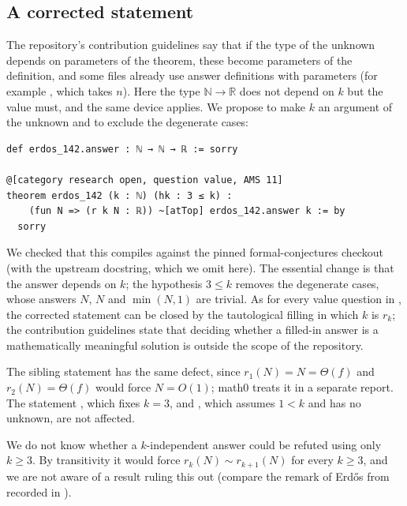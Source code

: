 \documentclass[11pt]{amsart}
\theoremstyle{plain}
\theoremstyle{definition}
\newcommand{\N}{\mathbb{N}}
\newcommand{\R}{\mathbb{R}}
\begin{document}
\subsection*{A corrected statement}
The repository's contribution guidelines say that if the type of the unknown depends on parameters of the theorem, these become parameters of the definition, and some files already use answer definitions with parameters (for example , which takes $n$). Here the type $\N\to\R$ does not depend on $k$ but the value must, and the same device applies. We propose to make $k$ an argument of the unknown and to exclude the degenerate cases:
\begin{lstlisting}
def erdos_142.answer : ℕ → ℕ → ℝ := sorry

@[category research open, question value, AMS 11]
theorem erdos_142 (k : ℕ) (hk : 3 ≤ k) :
    (fun N => (r k N : ℝ)) ~[atTop] erdos_142.answer k := by
  sorry
\end{lstlisting}
We checked that this compiles against the pinned formal-conjectures checkout (with the upstream docstring, which we omit here). The essential change is that the answer depends on $k$; the hypothesis $3\le k$ removes the degenerate cases, whose answers $N$, $N$ and $\min(N,1)$ are trivial. As for every value question in \cite{FC}, the corrected statement can be closed by the tautological filling in which  $k$ is $r_k$; the contribution guidelines state that deciding whether a filled-in answer is a mathematically meaningful solution is outside the scope of the repository.

The sibling statement  has the same defect, since $r_1(N)=N=\Theta(f)$ and $r_2(N)=\Theta(f)$ would force $N=O(1)$; math0 treats it in a separate report. The statement , which fixes $k=3$, and , which assumes $1<k$ and has no unknown, are not affected.

We do not know whether a $k$-independent answer could be refuted using only $k\ge 3$. By transitivity it would force $r_k(N)\sim r_{k+1}(N)$ for every $k\ge 3$, and we are not aware of a result ruling this out (compare the remark of Erd\H{o}s from \cite{Er80} recorded in \cite{EP142}).
\end{document}
